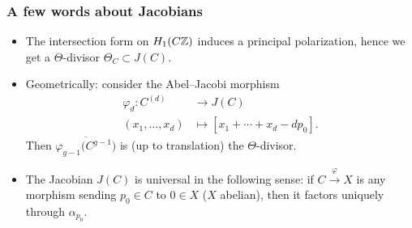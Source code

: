 \begin{frame}
\frametitle{A few words about Jacobians}

\begin{itemize}
	\item The intersection form on $H_1(C\mathbb{Z})$ induces a principal polarization, hence we get a \alert{$\Theta$-divisor} $\Theta_C \subset J(C)$.
	\item Geometrically: consider the Abel--Jacobi morphism
	\begin{align*}
	\varphi_d\colon C^{(d)} &\to J(C) \\
	(x_1,\ldots,x_d) &\mapsto [x_1+\cdots+ x_d-dp_0].
	\end{align*}
	Then $\overline{\varphi_{g-1}\big(C^{g-1}\big)}$ is (up to translation) the $\Theta$-divisor. \pause
	\item The Jacobian $J(C)$ is universal in the following sense: if $C \xrightarrow{\varphi} X$ is any morphism sending $p_0 \in C$ to $0 \in X$ ($X$ abelian), then it factors uniquely through $\alpha_{p_0}$.
\end{itemize}
\end{frame}